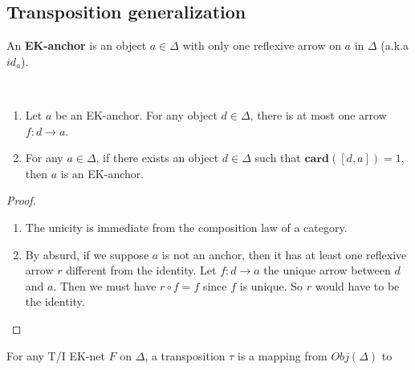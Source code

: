 \subsection{Transposition generalization}


\begin{defn}
    An \textbf{EK-anchor} is an object $a\in\Delta$  with only one reflexive arrow on $a$ in $\Delta$ (a.k.a $id_a$).
\end{defn}

\begin{prop}~
    \begin{enumerate}
        \item Let $a$ be an EK-anchor. For any object $d \in \Delta$, there is at most one arrow $f:d\rightarrow a$.
        \item For any $a\in \Delta$, if there exists an object $d\in \Delta$ such that $\textbf{card}([d,a]) = 1$, then $a$ is an EK-anchor.
    \end{enumerate}
    \label{anchorProp}
\end{prop}

\begin{proof}
    \begin{enumerate}
        \item The unicity is immediate from the composition law of a category.
        \item By absurd, if we suppose $a$ is not an anchor, then it has at least one reflexive arrow $r$ different from the identity. Let $f : d\rightarrow a$ the unique arrow between $d$ and $a$. Then we must have $r \circ f = f$ since $f$ is unique. So $r$ would have to be the identity.
    \end{enumerate}
\end{proof}

\begin{defn}
    For any T/I EK-net $F$ on $\Delta$, a transposition $\tau$ is a mapping from $Obj(\Delta)$ to $ $
\end{defn}


